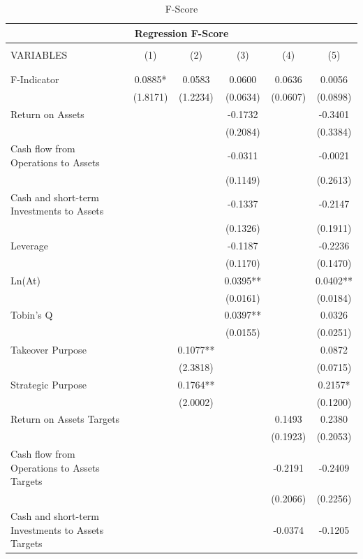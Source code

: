 \documentclass[12pt]{article}
\begin{document}
	\begin{table}[ht]
	\centering
	\caption{F-Score}

	\begin{adjustbox}{height=10cm, max width=\textwidth}
		\begin{tabular}{lccccc}
			\multicolumn{6}{c}{Regression F-Score} \\ \hline
			\\
			VARIABLES & (1) & (2) & (3) & (4) & (5) \\ \\ \hline
			 &  &  &  &  &  \\
			F-Indicator & 0.0885* & 0.0583 & 0.0600 & 0.0636 & 0.0056 \\
			 & (1.8171) & (1.2234) & (0.0634) & (0.0607) & (0.0898) \\
			Return on Assets &  &  & -0.1732 &  & -0.3401 \\
			 &  &  & (0.2084) &  & (0.3384) \\
			Cash flow from Operations to Assets &  &  & -0.0311 &  & -0.0021 \\
			 &  &  & (0.1149) &  & (0.2613) \\
			Cash and short-term Investments to Assets &  &  & -0.1337 &  & -0.2147 \\
			 &  &  & (0.1326) &  & (0.1911) \\
			Leverage &  &  & -0.1187 &  & -0.2236 \\
			 &  &  & (0.1170) &  & (0.1470) \\
			Ln(At) &  &  & 0.0395** &  & 0.0402** \\
			 &  &  & (0.0161) &  & (0.0184) \\
			Tobin's Q &  &  & 0.0397** &  & 0.0326 \\
			 &  &  & (0.0155) &  & (0.0251) \\
			Takeover Purpose &  & 0.1077** &  &  & 0.0872 \\
			 &  & (2.3818) &  &  & (0.0715) \\
			Strategic Purpose &  & 0.1764** &  &  & 0.2157* \\
			 &  & (2.0002) &  &  & (0.1200) \\
			Return on Assets Targets &  &  &  & 0.1493 & 0.2380 \\
			 &  &  &  & (0.1923) & (0.2053) \\
			Cash flow from Operations to Assets Targets &  &  &  & -0.2191 & -0.2409 \\
			 &  &  &  & (0.2066) & (0.2256) \\
			Cash and short-term Investments to Assets Targets &  &  &  & -0.0374 & -0.1205 \\

\end{tabular}
\end{adjustbox}
\end{table}
\end{document}
